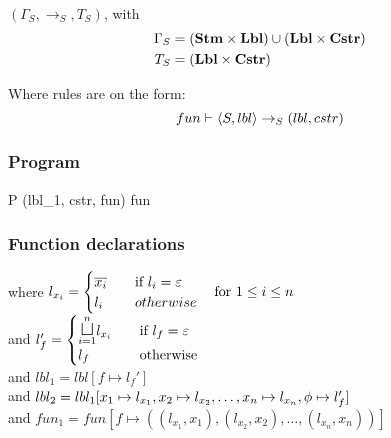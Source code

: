 \paragraph{}\noindent
$(\Gamma_S, \rightarrow_S, T_S)$, with
\begin{align*}
  \Gamma_S & = (\mathbf{Stm} \times \mathbf{Lbl}) \cup (\mathbf{Lbl} \times \mathbf{Cstr}) \\
  T_S & = (\mathbf{Lbl} \times \mathbf{Cstr})
\end{align*}

\noindent
Where rules are on the form:
\[ fun \vdash \langle S, lbl \rangle \rightarrow_{S} (lbl, cstr) \]

\subsubsection{Program}

        {}
        { \quad
          }
        {}
\begin{trules}
        { {P} {(lbl_1, cstr, fun)} }
        {fun \vdash {}}
        {}
\end{trules}

\subsubsection{Function declarations}

        {}
        {}
        {where $l_{x_i} = \begin{cases}
          \overline{x_i} & \quad \text{if } l_i = \varepsilon \\
          l_i & \quad otherwise
        \end{cases}\quad \text{for } 1 \leq i \leq n$ \\
          and $l_f' = \begin{cases}
            \mathlarger\sqcupl_{i = 1}^n l_{x_i} & \quad \text{if } l_f = \varepsilon \\
            l_f & \quad \text{otherwise}
        \end{cases}$ \\
          and $lbl_1 = lbl[f \mapsto l_f']$ \\
          and $lbl_2 = lbl_1[x_1 \mapsto l_{x_1}, x_2 \mapsto l_{x_2}, \dots, x_n \mapsto l_{x_n}, \phi \mapsto l_f']$ \\
          and $fun_1 = fun[f \mapsto ((l_{x_1}, x_1), (l_{x_2}, x_2), \dots, (l_{x_n}, x_n))]$}

